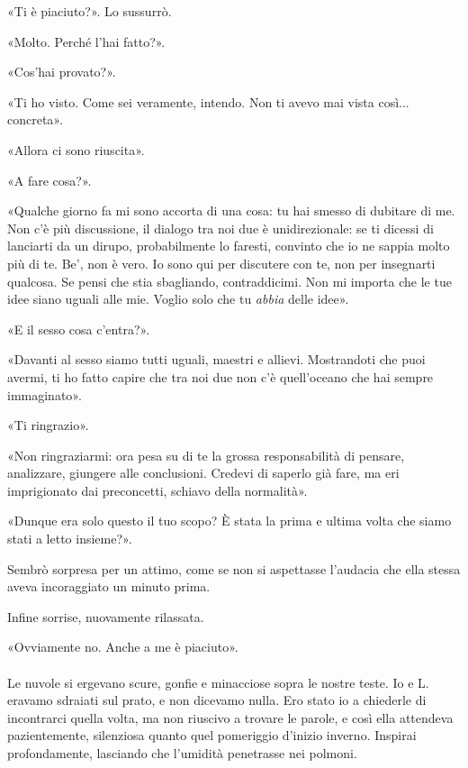 \documentclass[a4paper,12pt]{book}
\begin{document}
«Ti è piaciuto?». Lo sussurrò.

«Molto. Perché l'hai fatto?».

«Cos'hai provato?».

«Ti ho visto. Come sei veramente, intendo. Non ti avevo mai vista così...
concreta».

«Allora ci sono riuscita».

«A fare cosa?».

«Qualche giorno fa mi sono accorta di una cosa: tu hai smesso di dubitare di me.
Non c'è più discussione, il dialogo tra noi due è unidirezionale: se ti dicessi
di lanciarti da un dirupo, probabilmente lo faresti, convinto che io ne sappia
molto più di te. Be', non è vero. Io sono qui per discutere con te, non per
insegnarti qualcosa. Se pensi che stia sbagliando, contraddicimi. Non mi importa
che le tue idee siano uguali alle mie. Voglio solo che tu \emph{abbia} delle
idee».

«E il sesso cosa c'entra?».

«Davanti al sesso siamo tutti uguali, maestri e allievi. Mostrandoti che puoi
avermi, ti ho fatto capire che tra noi due non c'è quell'oceano che hai sempre
immaginato».

«Ti ringrazio».

«Non ringraziarmi: ora pesa su di te la grossa responsabilità di pensare,
analizzare, giungere alle conclusioni. Credevi di saperlo già fare, ma eri
imprigionato dai preconcetti, schiavo della normalità».

«Dunque era solo questo il tuo scopo? È stata la prima e ultima volta che siamo
stati a letto insieme?».

Sembrò sorpresa per un attimo, come se non si aspettasse l'audacia che ella
stessa aveva incoraggiato un minuto prima.

Infine sorrise, nuovamente rilassata.

«Ovviamente no. Anche a me è piaciuto».

\paragraph{}
Le nuvole si ergevano scure, gonfie e minacciose sopra le nostre teste. Io e L.
eravamo sdraiati sul prato, e non dicevamo nulla. Ero stato io a chiederle di
incontrarci quella volta, ma non riuscivo a trovare le parole, e così ella
attendeva pazientemente, silenziosa quanto quel pomeriggio d'inizio inverno.
Inspirai profondamente, lasciando che l'umidità penetrasse nei polmoni.
\end{document}
